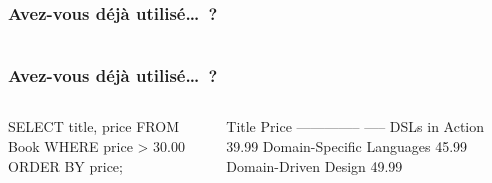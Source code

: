 
\begin{frame}[fragile]
\frametitle{Avez-vous d\'ej\`a utilis\'e\ldots\ ?}


\begin{columns}

\begin{column}{5cm}
\begin{block}{}
{\footnotesize
{}
}
\end{block}
\end{column}


\begin{column}{5cm}
\begin{block}{}
{\footnotesize
{}
}
\end{block}
\end{column}

\end{columns}


\end{frame}

\begin{frame}[fragile]
\frametitle{Avez-vous d\'ej\`a utilis\'e\ldots\ ?}

\begin{columns}
\begin{column}{4.2cm}
\begin{block}{}
{\footnotesize
\begin{semiverbatim}
SELECT title, price
  FROM  Book
   WHERE price > 30.00
  ORDER BY price;
\end{semiverbatim}
}
\end{block}
\end{column}


\begin{column}{6cm}
\begin{block}{}
{\footnotesize
\begin{semiverbatim}
Title                     Price
--------------                 -----
DSLs in Action            39.99
Domain-Specific Languages 45.99
Domain-Driven Design      49.99
\end{semiverbatim}
}
\end{block}
\end{column}

\end{columns}




\end{frame}



